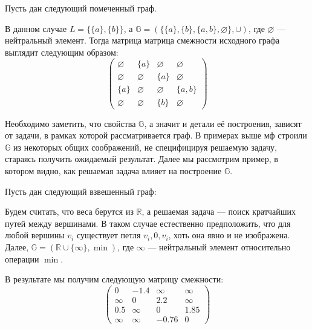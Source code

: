 \begin{example}
  Пусть дан следующий помеченный граф.
  \begin{center}
    
  \end{center}

  В данном случае $L = \{\{a\},\{b\}\}$, а $\mathbb{G} = ( \{\{a\},\{b\},\{a,b\},\varnothing\} ,\cup)$, где $\varnothing$ --- нейтральный элемент.
  Тогда матрица матрица смежности исходного графа выглядит следующим образом:
  $$
  \begin{pmatrix}
    \varnothing   & \{a\}       & \varnothing & \varnothing \\
    \varnothing   & \varnothing & \{a\}       & \varnothing \\
    \{a\}         & \varnothing & \varnothing & \{a,b\} \\
    \varnothing   & \varnothing & \{b\}       & \varnothing
  \end{pmatrix}
  $$
\end{example}

Необходимо заметить, что свойства $\mathbb{G}$, а значит и детали её построения, зависят от задачи, в рамках которой рассматривается граф. В примерах выше мф строили $\mathbb{G}$ из некоторых общих соображений, не специфицируя решаемую задачу, стараясь получить ожидаемый результат. Далее мы рассмотрим пример, в котором видно, как решаемая задача влияет на построение $\mathbb{G}$.

\begin{example}\label{example:apspGraph}
  Пусть дан следующий взвешенный граф:
  \begin{center}
    
  \end{center}

  Будем считать, что веса берутся из $\mathbb{R}$, а решаемая задача --- поиск кратчайших путей между вершинами. В таком случае естественно предположить, что для любой вершины $v_i$ существует петля $v_i,0,v_i$, хоть она явно и не изображена. Далее, $\mathbb{G} = ( \mathbb{R}\cup \{\infty\} , \min)$, где $\infty$ --- нейтральный элемент относительно операции $\min$. 

  В результате мы получим следующую матрицу смежности:
  $$
  \begin{pmatrix}
    0 & -1.4 & \infty & \infty \\
    \infty & 0 & 2.2 & \infty \\
    0.5 & \infty & 0 & 1.85 \\
    \infty & \infty & -0.76 & 0
  \end{pmatrix}
  $$
\end{example}

